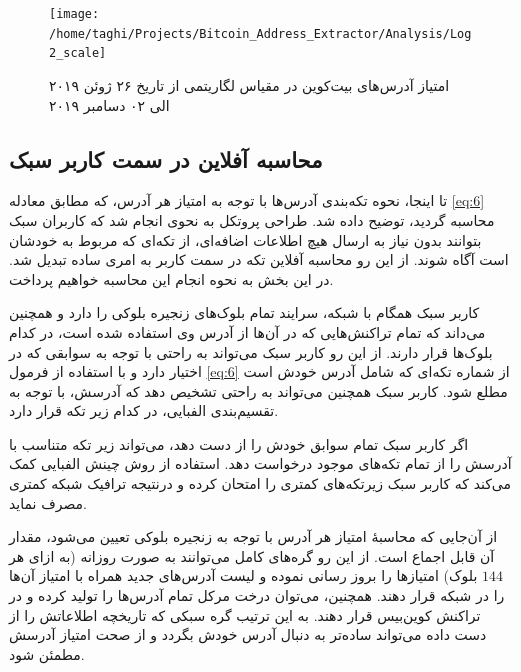 \begin{figure}[t]
	\centering
	\texttt{[image: /home/taghi/Projects/Bitcoin\_Address\_Extractor/Analysis/Log2\_scale]}
	\caption[امتیاز آدرس‌های بیت‌کوین در مقیاس لگاریتمی]{امتیاز آدرس‌های بیت‌کوین در مقیاس لگاریتمی از تاریخ ۲۶ ژوئن ۲۰۱۹ الی ۰۲ دسامبر ۲۰۱۹}
	\label{fig:log2scale}
\end{figure}


\subsection{محاسبه آفلاین در سمت کاربر سبک}
\label{subsubsection:4.3.3}
تا اینجا، نحوه تکه‌بندی آدرس‌ها با توجه به امتیاز هر آدرس، که مطابق معادله \eqref{eq:6} محاسبه گردید، توضیح داده شد. طراحی پروتکل به نحوی انجام شد که کاربران سبک بتوانند بدون نیاز به ارسال هیچ اطلاعات اضافه‌ای، از تکه‌ای که مربوط به خودشان است آگاه شوند. از این رو محاسبه آفلاین تکه در سمت کاربر به امری ساده تبدیل شد. در این بخش به نحوه انجام این محاسبه خواهیم پرداخت.

کاربر سبک همگام با شبکه، سرایند تمام بلوک‌های زنجیره بلوکی را دارد و همچنین می‌داند که تمام تراکنش‌هایی که در آن‌ها از آدرس وی استفاده شده است، در کدام بلوک‌ها قرار دارند. از این رو کاربر سبک می‌تواند به راحتی با توجه به سوابقی که در اختیار دارد و با استفاده از فرمول \eqref{eq:6} از شماره تکه‌ای که شامل آدرس خودش است مطلع شود. کاربر سبک همچنین می‌تواند به راحتی تشخیص دهد که آدرسش، با توجه به تقسیم‌بندی الفبایی، در کدام زیر تکه قرار دارد. 

اگر کاربر سبک تمام سوابق خودش را از دست دهد، می‌تواند زیر تکه متناسب با آدرسش را از تمام تکه‌های موجود درخواست دهد. استفاده از روش چینش الفبایی کمک می‌کند که کاربر سبک  زیرتکه‌های کمتری را امتحان کرده و درنتیجه ترافیک شبکه کمتری مصرف نماید.

از آن‌جایی که محاسبهٔ امتیاز هر آدرس با توجه به زنجیره بلوکی تعیین می‌شود، مقدار آن قابل اجماع است. از این رو گره‌های کامل می‌توانند به صورت روزانه (به ازای هر $144$ بلوک) امتیازها را بروز رسانی نموده و لیست آدرس‌های جدید همراه با امتیاز آن‌ها را در شبکه قرار دهند. همچنین، می‌توان درخت مرکل تمام آدرس‌ها را تولید کرده و در تراکنش کوین‌بیس قرار دهند. به این ترتیب گره سبکی که تاریخچه اطلاعاتش را از دست داده می‌تواند ساده‌تر به دنبال آدرس خودش بگردد و از صحت امتیاز آدرسش مطمئن شود.


%	
%	
%	
%	

